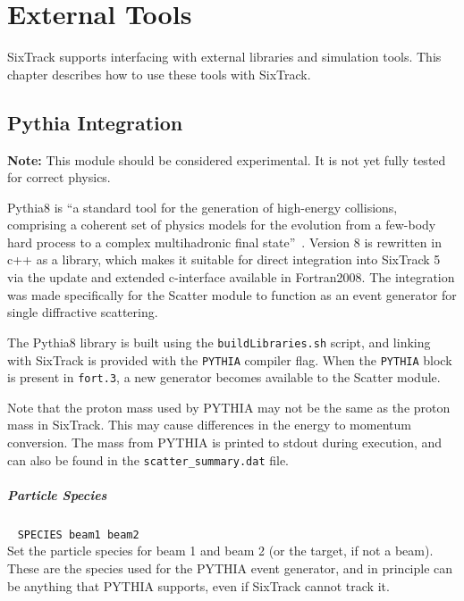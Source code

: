 
\chapter{External Tools} \label{ExtTools}

SixTrack supports interfacing with external libraries and simulation tools.
This chapter describes how to use these tools with SixTrack.

\section{Pythia Integration} \label{ExtPythia}

\textcolor{notered}{\textbf{Note:} This module should be considered experimental. It is not yet fully tested for correct physics.}

Pythia8 is ``a standard tool for the generation of high-energy collisions, comprising a coherent set of physics models for the evolution from a few-body hard process to a complex multihadronic final state''~\cite{pythia8}.
Version 8 is rewritten in c++ as a library, which makes it suitable for direct integration into SixTrack 5 via the update and extended c-interface available in Fortran2008.
The integration was made specifically for the Scatter module to function as an event generator for single diffractive scattering.

The Pythia8 library is built using the \texttt{buildLibraries.sh} script, and linking with SixTrack is provided with the \texttt{PYTHIA} compiler flag.
When the \texttt{PYTHIA} block is present in \texttt{fort.3}, a new generator becomes available to the Scatter module.

Note that the proton mass used by PYTHIA may not be the same as the proton mass in SixTrack.
This may cause differences in the energy to momentum conversion.
The mass from PYTHIA is printed to stdout during execution, and can also be found in the \texttt{scatter\_summary.dat} file.

\paragraph{Particle Species}~ \texttt{SPECIES beam1 beam2}\\

Set the particle species for beam 1 and beam 2 (or the target, if not a beam).
These are the species used for the PYTHIA event generator, and in principle can be anything that PYTHIA supports, even if SixTrack cannot track it.

